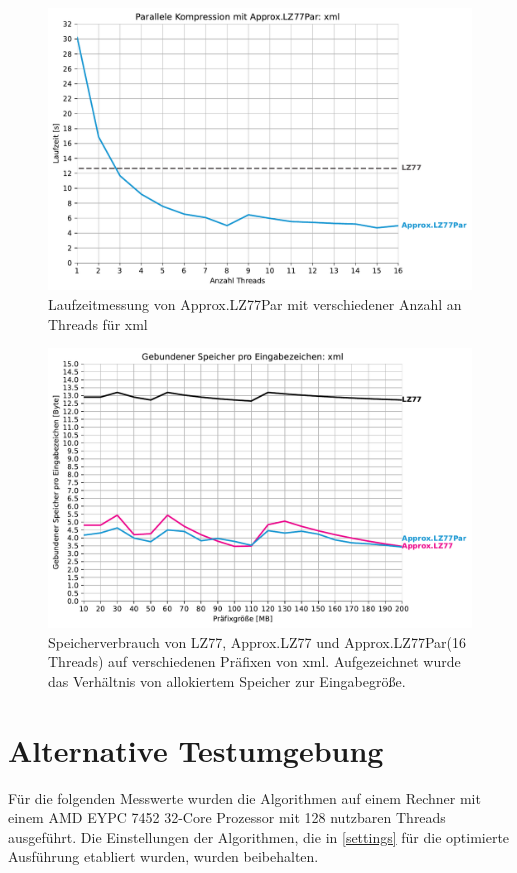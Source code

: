 \begin{figure}[H]
    \centering
    \caption{Laufzeitmessung von Approx.LZ77Par mit verschiedener Anzahl an Threads für xml}
    \includegraphics[scale=0.68]{Images/progressive_speedup_xml.pdf}
\end{figure}

\begin{figure}[H]
    \centering
    \caption{Speicherverbrauch von LZ77, Approx.LZ77 und Approx.LZ77Par(16 Threads) auf verschiedenen Präfixen von xml. Aufgezeichnet wurde das Verhältnis
    von allokiertem Speicher zur Eingabegröße.}
    \includegraphics[scale=0.65]{Images/progressive_mem_xml.pdf}
\end{figure}

\section{Alternative Testumgebung}
Für die folgenden Messwerte wurden die Algorithmen auf einem Rechner mit einem AMD EYPC 7452 32-Core Prozessor mit 128 nutzbaren Threads ausgeführt.
Die Einstellungen der Algorithmen, die in \ref{settings} für die optimierte Ausführung etabliert wurden, wurden beibehalten.

